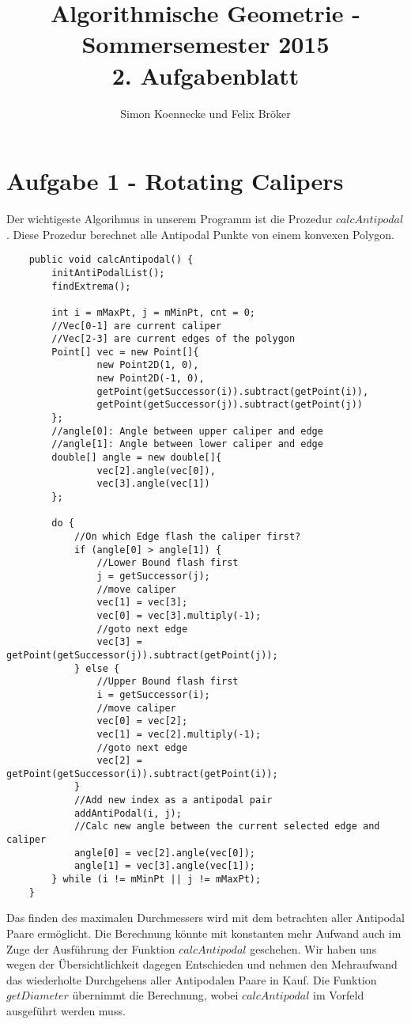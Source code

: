 \documentclass[a4paper]{article}
\begin{document}
\title{Algorithmische Geometrie - Sommersemester 2015\\
       2. Aufgabenblatt }
\author{Simon Koennecke und Felix Bröker}
\date{}
\maketitle

\section*{Aufgabe 1 - Rotating Calipers}

Der wichtigeste Algorihmus in unserem Programm ist die Prozedur $calcAntipodal$. Diese Prozedur berechnet alle Antipodal Punkte von einem konvexen Polygon.

\begin{lstlisting}
    public void calcAntipodal() {
        initAntiPodalList();
        findExtrema();

        int i = mMaxPt, j = mMinPt, cnt = 0;
        //Vec[0-1] are current caliper
        //Vec[2-3] are current edges of the polygon
        Point[] vec = new Point[]{
                new Point2D(1, 0),
                new Point2D(-1, 0),
                getPoint(getSuccessor(i)).subtract(getPoint(i)),
                getPoint(getSuccessor(j)).subtract(getPoint(j))
        };
        //angle[0]: Angle between upper caliper and edge
		//angle[1]: Angle between lower caliper and edge
        double[] angle = new double[]{
                vec[2].angle(vec[0]),
                vec[3].angle(vec[1])
        };

        do {
            //On which Edge flash the caliper first?
            if (angle[0] > angle[1]) {
                //Lower Bound flash first
                j = getSuccessor(j);
                //move caliper
                vec[1] = vec[3];
                vec[0] = vec[3].multiply(-1);
                //goto next edge
                vec[3] = getPoint(getSuccessor(j)).subtract(getPoint(j));
            } else {
                //Upper Bound flash first
                i = getSuccessor(i);
                //move caliper
                vec[0] = vec[2];
                vec[1] = vec[2].multiply(-1);
                //goto next edge
                vec[2] = getPoint(getSuccessor(i)).subtract(getPoint(i));
            }
            //Add new index as a antipodal pair
            addAntiPodal(i, j);
			//Calc new angle between the current selected edge and caliper
            angle[0] = vec[2].angle(vec[0]);
            angle[1] = vec[3].angle(vec[1]);
        } while (i != mMinPt || j != mMaxPt);
    }

\end{lstlisting}
Das finden des maximalen Durchmessers wird mit dem betrachten aller Antipodal Paare ermöglicht. Die Berechnung könnte mit konstanten mehr Aufwand auch im Zuge der Ausführung der Funktion $calcAntipodal$ geschehen. Wir haben uns wegen der Übersichtlichkeit dagegen Entschieden und nehmen den Mehraufwand das wiederholte Durchgehens aller Antipodalen Paare in Kauf. Die Funktion $getDiameter$ übernimmt die Berechnung, wobei $calcAntipodal$ im Vorfeld ausgeführt werden muss.
\end{document}
